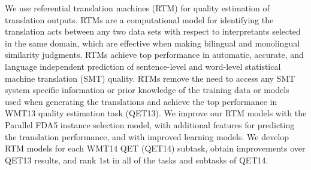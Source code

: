 We use referential translation machines (RTM) for quality estimation of translation outputs. RTMs are a computational model for identifying the translation acts between any two data sets with respect to interpretants selected in the same domain, which are effective when making bilingual and monolingual similarity judgments. RTMs achieve top performance in automatic, accurate, and language independent prediction of sentence-level and word-level statistical machine translation (SMT) quality. RTMs remove the need to access any SMT system specific information or prior knowledge of the training data or models used when generating the translations and achieve the top performance in WMT13 quality estimation task (QET13). We improve our RTM models with the Parallel FDA5 instance selection model, with additional features for predicting the translation performance, and with improved learning models. We develop RTM models for each WMT14 QET (QET14) subtask, obtain improvements over QET13 results, and rank $1$st in all of the tasks and subtasks of QET14.
